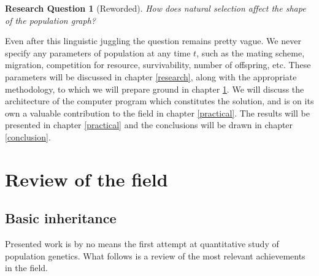 \documentclass{l4proj}
\newtheorem*{quest}{Research Question}
\newif\ifdebug
\begin{document}
\begin{quest}[Reworded]
How does natural selection affect the shape of the population graph?
\end{quest}

Even after this linguistic juggling the question remains pretty vague. We never specify any parameters of population at any time $t$, such as the mating scheme, migration, competition for resource, survivability, number of offspring, etc. These parameters will be discussed in chapter \ref{research}, along with the appropriate methodology, to which we will prepare ground in chapter \ref{review}. We will discuss the architecture of the computer program which constitutes the solution, and is on its own a valuable contribution to the field in chapter \ref{practical}. The results will be presented in chapter \ref{practical} and the conclusions will be drawn in chapter \ref{conclusion}.

\chapter{Review of the field}\label{review}

\ifdebug
  This should be a critical survey of the relevant literature, adhering to normal academic conventions in citing references, etc. Here I need to discuss coalescent method vs. forward-in time method vs. sample-based methods.

explain trait, explain mendelian genetics, explain homozygous, heterozygous, dominant, sweep, polymorphism example of polymorphism: impression of bitterness while eating brussel sprouts, linkage equilibrium, panmictic population, allele, epigenetics, probability density function.
\fi

\section{Basic inheritance}

Presented work is by no means the first attempt at quantitative study of population genetics. What follows is a review of the most relevant achievements in the field.
\end{document}
